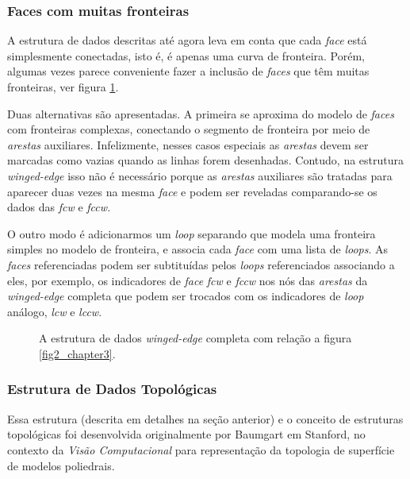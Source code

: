 \documentclass[12pt,a4paper]{book}
\begin{document}
\subsubsection{Faces com muitas fronteiras}

A estrutura de dados descritas at\'{e} agora leva em conta que cada \textit{%
face} est\'{a} simplesmente conectadas, isto \'{e}, \'{e} apenas uma curva de
fronteira. Por\'{e}m, algumas vezes parece conveniente fazer a inclus\~{a}o
de \textit{faces} que t\^{e}m muitas fronteiras, ver figura \ref{fig6_chapter3}.

Duas alternativas s\~{a}o apresentadas. A primeira se aproxima do modelo de 
\textit{faces} com fronteiras complexas, conectando o segmento de fronteira
por meio de \textit{arestas} auxiliares. Infelizmente, nesses casos especiais
as \textit{arestas} devem ser marcadas como vazias quando as linhas forem
desenhadas. Contudo, na estrutura \textit{winged-edge} isso n\~{a}o \'{e}
necess\'{a}rio porque as \textit{arestas} auxiliares s\~{a}o tratadas para
aparecer duas vezes na mesma \textit{face} e podem ser reveladas comparando-se
os dados das \textit{fcw} e \textit{fccw.}

O outro modo \'{e} adicionarmos um \textit{loop} separando que modela uma fronteira simples no modelo de fronteira, e associa cada \emph{face} com uma lista de \textit{loops}. As \textit{faces} referenciadas podem ser subtitu\'idas pelos \textit{loops} referenciados associando a eles, por exemplo, os indicadores de \textit{face} \textit{fcw} e \textit{fccw} nos n\'{o}s das \textit{arestas} da \textit{winged-edge} completa que podem ser trocados com os indicadores de \textit{loop} an\'{a}logo, \textit{lcw} e \textit{lccw}.

\begin{figure}[htbp]
  \begin{center}
    \leavevmode
    
    \caption{A estrutura de dados \textit{winged-edge} completa com rela\c{c}\~{a}o a figura \ref{fig2_chapter3}.}  
    \label{fig6_chapter3}
  \end{center}
\end{figure}

\subsubsection [\textit{winged-edge modificada}]{Estrutura de Dados Topol\'{o}gicas}

Essa estrutura (descrita em detalhes na se\c{c}\~{a}o anterior) e o conceito de estruturas 
topol\'{o}gicas foi desenvolvida originalmente por Baumgart \cite{baumgart,baumgart2}em Stanford, 
no contexto da \textit{Vis\~{a}o Computacional} para  representa\c{c}\~{a}o da topologia de superf\'{i}cie de modelos poliedrais.
 
\end{document}
